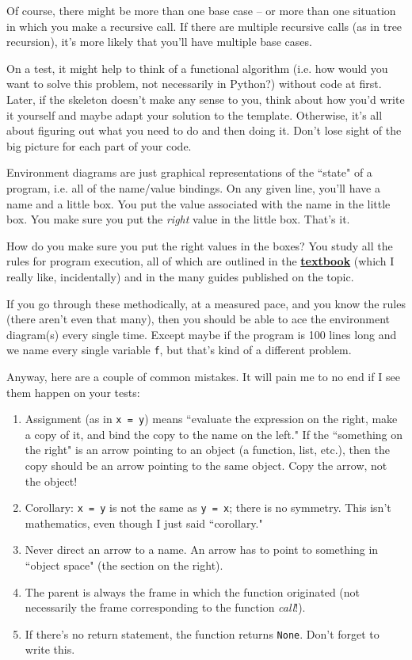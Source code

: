 \documentclass[twoside]{article}
\begin{document}
\begin{enumerate}
Of course, there might be more than one base case -- or more than one situation in which you make a recursive call. If there are multiple recursive calls (as in tree recursion), it's more likely that you'll have multiple base cases.

On a test, it might help to think of a functional algorithm (i.e. how would you want to solve this problem, not necessarily in Python?) without code at first. Later, if the skeleton doesn't make any sense to you, think about how you'd write it yourself and maybe adapt your solution to the template. Otherwise, it's all about figuring out what you need to do and then doing it. Don't lose sight of the big picture for each part of your code.


Environment diagrams are just graphical representations of the ``state" of a program, i.e. all of the name/value bindings. On any given line, you'll have a name and a little box. You put the value associated with the name in the little box. You make sure you put the \textit{right} value in the little box. That's it.

How do you make sure you put the right values in the boxes? You study all the rules for program execution, all of which are outlined in the \textbf{\href{http://composingprograms.com/}{textbook}} (which I really like, incidentally) and in the many guides published on the topic.

If you go through these methodically, at a measured pace, and you know the rules (there aren't even that many), then you should be able to ace the environment diagram(s) every single time. Except maybe if the program is 100 lines long and we name every single variable \texttt{f}, but that's kind of a different problem.

Anyway, here are a couple of common mistakes. It will pain me to no end if I see them happen on your tests:
\begin{enumerate}
\item Assignment (as in \texttt{x = y}) means ``evaluate the expression on the right, make a copy of it, and bind the copy to the name on the left." If the ``something on the right" is an arrow pointing to an object (a function, list, etc.), then the copy should be an arrow pointing to the same object. Copy the arrow, not the object!
\item Corollary: \texttt{x = y} is not the same as \texttt{y = x}; there is no symmetry. This isn't mathematics, even though I just said ``corollary."
\item Never direct an arrow to a name. An arrow has to point to something in ``object space" (the section on the right).
\item The parent is always the frame in which the function originated (not necessarily the frame corresponding to the function \textit{call}!).
\item If there's no return statement, the function returns \texttt{None}. Don't forget to write this.
\end{enumerate}


\end{enumerate}
\end{document}
